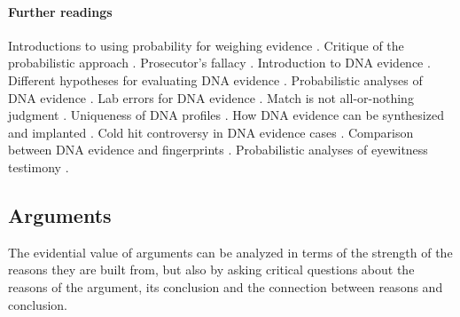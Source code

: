 \documentclass[10pt]{article}
\begin{document}


\paragraph{Further readings} Introductions to using probability for weighing evidence 
 \citep{finkelsteinFairley1970, dawid2002, morteraDawid2007}. Critique 
of the probabilistic approach \citep{tribe1971, cohen1977, allenPardo2007}.
Prosecutor's fallacy \citep{thompsonSchuman1987}.
Introduction to DNA evidence \citep{wasserman2008, kayeSensabaugh2000}.
Different hypotheses for evaluating DNA evidence \citep{koehler1993, cookEtAl1998, evettEtal2000}. 
Probabilistic analyses of DNA evidence  \citep{robertsonVignaux1995, buckleton2005, balding2005}. 
 Lab errors for DNA evidence \citep{thompsonEtAl2003}. 
 Match is not all-or-nothing judgment \citep{kaye1993}. 
Uniqueness of DNA profiles  \citep{kaye2013, weir2007}.
How DNA evidence can be synthesized and implanted \citep{frumkinEtAl2009}. 
Cold hit controversy in DNA evidence cases \citep{NRC1996, baldingDonnely1996}. 
Comparison between DNA evidence and fingerprints  \citep{zabell2005}. 
Probabilistic analyses of eyewitness testimony \citep{friedman1987, schum1994, schumStarace2001}. 

\subsection{Arguments}
\label{sec:valueArgs}

The evidential value of arguments can be analyzed in terms of the strength 
of the reasons they are built from, but also by asking critical questions 
about the reasons of the argument, its conclusion and the connection 
between reasons and conclusion. 
\end{document}

